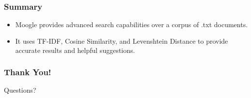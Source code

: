 \documentclass{beamer}
\begin{document}
\begin{frame}
\frametitle{Summary}
\begin{itemize}
\item Moogle provides advanced search capabilities over a corpus of .txt documents.
\item It uses TF-IDF, Cosine Similarity, and Levenshtein Distance to provide accurate results and helpful suggestions.
\end{itemize}
\end{frame}

\begin{frame}
\frametitle{Thank You!}
\centering
Questions?
\end{frame}
\end{document}
